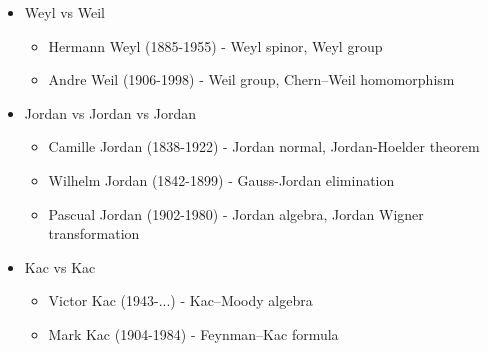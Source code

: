 \documentclass[10pt,a4paper]{book}
\theoremstyle{definition}
\begin{document}
\begin{itemize}
\item Weyl vs Weil
    \begin{itemize}
    \item {\sc Hermann Weyl} (1885-1955) - Weyl spinor, Weyl group
    \item {\sc Andre Weil} (1906-1998) - Weil group, Chern–Weil homomorphism
    \end{itemize}
\item Jordan vs Jordan vs Jordan
    \begin{itemize}
    \item {\sc Camille Jordan} (1838-1922) - Jordan normal, Jordan-Hoelder theorem
    \item {\sc Wilhelm Jordan} (1842-1899) - Gauss-Jordan elimination
    \item {\sc Pascual Jordan} (1902-1980) - Jordan algebra, Jordan Wigner transformation
    \end{itemize}
\item Kac vs Kac
    \begin{itemize}
    \item {\sc Victor Kac} (1943-...) - Kac–Moody algebra
    \item {\sc Mark Kac} (1904-1984) - Feynman–Kac formula
    \end{itemize}
\end{itemize}
\end{document}
